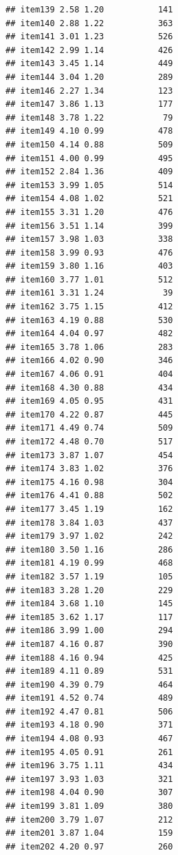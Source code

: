 \documentclass[
  man]{apa6}
\begin{document}
\begin{verbatim}
## item139 2.58 1.20           141
## item140 2.88 1.22           363
## item141 3.01 1.23           526
## item142 2.99 1.14           426
## item143 3.45 1.14           449
## item144 3.04 1.20           289
## item146 2.27 1.34           123
## item147 3.86 1.13           177
## item148 3.78 1.22            79
## item149 4.10 0.99           478
## item150 4.14 0.88           509
## item151 4.00 0.99           495
## item152 2.84 1.36           409
## item153 3.99 1.05           514
## item154 4.08 1.02           521
## item155 3.31 1.20           476
## item156 3.51 1.14           399
## item157 3.98 1.03           338
## item158 3.99 0.93           476
## item159 3.80 1.16           403
## item160 3.77 1.01           512
## item161 3.31 1.24            39
## item162 3.75 1.15           412
## item163 4.19 0.88           530
## item164 4.04 0.97           482
## item165 3.78 1.06           283
## item166 4.02 0.90           346
## item167 4.06 0.91           404
## item168 4.30 0.88           434
## item169 4.05 0.95           431
## item170 4.22 0.87           445
## item171 4.49 0.74           509
## item172 4.48 0.70           517
## item173 3.87 1.07           454
## item174 3.83 1.02           376
## item175 4.16 0.98           304
## item176 4.41 0.88           502
## item177 3.45 1.19           162
## item178 3.84 1.03           437
## item179 3.97 1.02           242
## item180 3.50 1.16           286
## item181 4.19 0.99           468
## item182 3.57 1.19           105
## item183 3.28 1.20           229
## item184 3.68 1.10           145
## item185 3.62 1.17           117
## item186 3.99 1.00           294
## item187 4.16 0.87           390
## item188 4.16 0.94           425
## item189 4.11 0.89           531
## item190 4.39 0.79           464
## item191 4.52 0.74           489
## item192 4.47 0.81           506
## item193 4.18 0.90           371
## item194 4.08 0.93           467
## item195 4.05 0.91           261
## item196 3.75 1.11           434
## item197 3.93 1.03           321
## item198 4.04 0.90           307
## item199 3.81 1.09           380
## item200 3.79 1.07           212
## item201 3.87 1.04           159
## item202 4.20 0.97           260
\end{verbatim}
\end{document}
